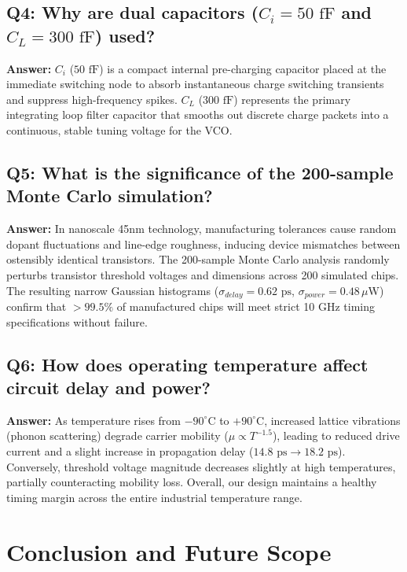 \documentclass[11pt,a4paper]{report}
\begin{document}
\section*{Q4: Why are dual capacitors ($C_i = 50\text{ fF}$ and $C_L = 300\text{ fF}$) used?}
\textbf{Answer:} $C_i$ ($50\text{ fF}$) is a compact internal pre-charging capacitor placed at the immediate switching node to absorb instantaneous charge switching transients and suppress high-frequency spikes. $C_L$ ($300\text{ fF}$) represents the primary integrating loop filter capacitor that smooths out discrete charge packets into a continuous, stable tuning voltage for the VCO.

\section*{Q5: What is the significance of the 200-sample Monte Carlo simulation?}
\textbf{Answer:} In nanoscale 45nm technology, manufacturing tolerances cause random dopant fluctuations and line-edge roughness, inducing device mismatches between ostensibly identical transistors. The 200-sample Monte Carlo analysis randomly perturbs transistor threshold voltages and dimensions across 200 simulated chips. The resulting narrow Gaussian histograms ($\sigma_{delay} = 0.62\text{ ps}$, $\sigma_{power} = 0.48\,\mu\text{W}$) confirm that $>99.5\%$ of manufactured chips will meet strict 10 GHz timing specifications without failure.

\section*{Q6: How does operating temperature affect circuit delay and power?}
\textbf{Answer:} As temperature rises from $-90^\circ\text{C}$ to $+90^\circ\text{C}$, increased lattice vibrations (phonon scattering) degrade carrier mobility ($\mu \propto T^{-1.5}$), leading to reduced drive current and a slight increase in propagation delay ($14.8\text{ ps} \to 18.2\text{ ps}$). Conversely, threshold voltage magnitude decreases slightly at high temperatures, partially counteracting mobility loss. Overall, our design maintains a healthy timing margin across the entire industrial temperature range.

\newpage

\chapter{Conclusion and Future Scope}
\end{document}

